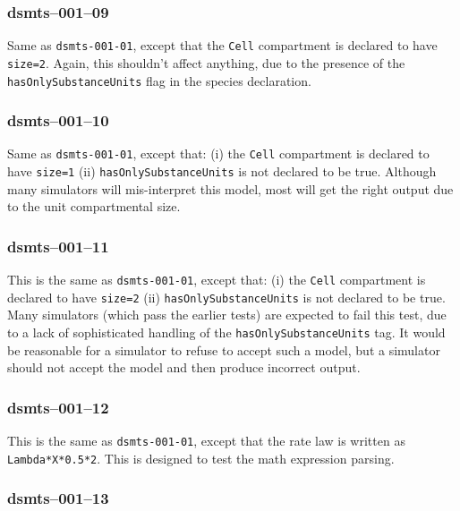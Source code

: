 
\subsubsection{dsmts--001--09}

 Same as \verb$dsmts-001-01$, except
that the \verb$Cell$ compartment is declared to have
\verb$size=2$. Again, this shouldn't affect anything, due to the
presence of the \verb$hasOnlySubstanceUnits$ flag in the species
declaration.


\subsubsection{dsmts--001--10}

Same as
\verb$dsmts-001-01$, except that: (i) the \verb$Cell$ compartment is
declared to have 
\verb$size=1$ (ii) \verb$hasOnlySubstanceUnits$ is not declared to be
true. Although many simulators will mis-interpret this model, most
will get the right output due to the unit compartmental size. 


\subsubsection{dsmts--001--11}

This is the same as \verb$dsmts-001-01$, except that: (i) the
\verb$Cell$ compartment is declared to 
have \verb$size=2$ (ii) \verb$hasOnlySubstanceUnits$ is not declared
to be true. Many simulators (which pass the earlier tests) are
expected to fail this test, due to a lack of sophisticated handling of
the \verb$hasOnlySubstanceUnits$ tag. It would be reasonable for a
simulator to refuse to accept such a model, but a simulator should not
accept the model and then produce incorrect output.


\subsubsection{dsmts--001--12}

This is the same as \verb$dsmts-001-01$, except that the rate law is
written as \verb$Lambda*X*0.5*2$. This is designed to test the math
expression parsing.


\subsubsection{dsmts--001--13}

